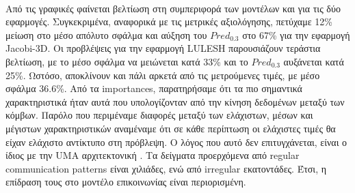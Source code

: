\paragraph{}
Από τις γραφικές φαίνεται βελτίωση στη συμπεριφορά των μοντέλων και για τις δύο εφαρμογές. Συγκεκριμένα, αναφορικά με τις μετρικές αξιολόγησης, πετύχαμε 12\% μείωση στο μέσο απόλυτο σφάλμα και αύξηση του $Pred_{0.3}$ στο 67\% για την εφαρμογή Jacobi-3D. Οι προβλέψεις για την εφαρμογή LULESH παρουσιάζουν τεράστια βελτίωση, με το μέσο σφάλμα να μειώνεται κατά 33\% και το $Pred_{0.3}$ αυξάνεται κατά 25\%. Ωστόσο, αποκλίνουν και πάλι αρκετά από τις μετρούμενες τιμές, με μέσο σφάλμα 36.6\%. Από τα importances, παρατηρήσαμε ότι τα πιο σημαντικά χαρακτηριστικά ήταν αυτά που υπολογίζονταν από την κίνηση δεδομένων μεταξύ των κόμβων. Παρόλο που περιμέναμε διαφορές μεταξύ των ελάχιστων, μέσων και μέγιστων χαρακτηριστικών αναμέναμε ότι σε κάθε περίπτωση οι ελάχιστες τιμές θα είχαν ελάχιστο αντίκτυπο στη πρόβλεψη. Ο λόγος που αυτό δεν επιτυγχάνεται, είναι ο ίδιος με την UMA αρχιτεκτονική . Τα δείγματα προερχόμενα από regular communication patterns είναι χιλιάδες, ενώ από irregular εκατοντάδες. Έτσι, η επίδραση τους στο μοντέλο επικοινωνίας είναι περιορισμένη.

